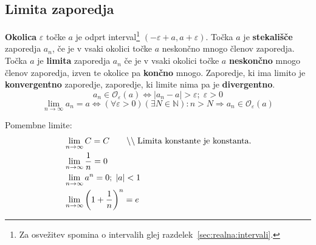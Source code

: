 \documentclass[a4paper,oneside,12pt,fleqn]{article}
\def\N{\ensuremath{\mathbb N}}
\newcommand{\comment}[1]{\ensuremath{\qquad\backslash\backslash\;}\textnormal{#1}}
\def\limi{\displaystyle\lim_{n\to\infty}} %
\renewcommand\implies\Rightarrow
\renewcommand\iff\Leftrightarrow
\numberwithin{equation}{section}
\begin{document}
\subsection{Limita zaporedja}
\label{sec:zap:lim}
\textbf{Okolica} $\varepsilon$ točke $a$ je odprt interval\footnote{Za osvežitev spomina o
intervalih glej razdelek~\ref{sec:realna:intervali}.} $(-\varepsilon+a, a+\varepsilon)$. Točka
$a$ je \textbf{stekališče} zaporedja $a_n$, če je v vsaki okolici točke $a$ neskončno mnogo členov
zaporedja. Točka $a$ je \textbf{limita} zaporedja $a_n$ če je v vsaki okolici točke $a$
\textbf{neskončno} mnogo členov zaporedja, izven te okolice pa \textbf{končno} mnogo. Zaporedje, ki ima limito je
\textbf{konvergentno} zaporedje, zaporedje, ki limite nima pa je \textbf{divergentno}. 
\[ a_n \in \mathcal{O}_{\varepsilon}(a) \iff |a_n - a| > \varepsilon; \; \varepsilon > 0 \]
\[ \limi a_n = a \iff (\forall \varepsilon > 0)(\exists N \in \N): n > N \implies a_n \in
\mathcal{O}_{\varepsilon}(a) \]

Pomembne limite:
\begin{align}
  & \limi C = C \comment{Limita konstante je konstanta.} \label{eq:zap:lim:konst} \\
  & \limi \frac{1}{n} = 0  \label{eq:zap:lim:1n} \\
  & \limi a^n = 0; \; \left|a\right| < 1 \label{eq:zap:lim:an} \\
  & \limi \left(1 + \frac{1}{n}\right)^n = e \label{eq:zap:lim:e}
\end{align}
\end{document}
